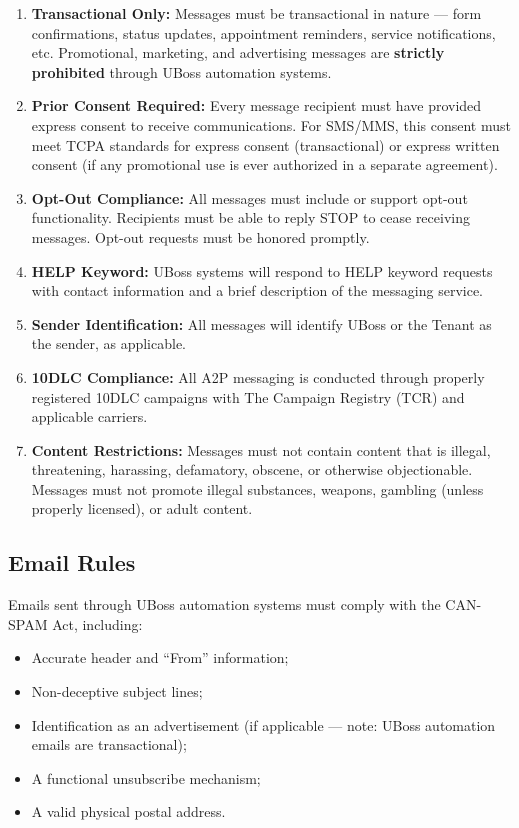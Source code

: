 \documentclass[11pt,letterpaper,parskip=half]{scrartcl}
\begin{document}
\begin{enumerate}[nosep, leftmargin=1.5em]
    \item \textbf{Transactional Only:} Messages must be transactional in nature --- form confirmations, status updates, appointment reminders, service notifications, etc. Promotional, marketing, and advertising messages are \textbf{strictly prohibited} through UBoss automation systems.
    \item \textbf{Prior Consent Required:} Every message recipient must have provided express consent to receive communications. For SMS/MMS, this consent must meet TCPA standards for express consent (transactional) or express written consent (if any promotional use is ever authorized in a separate agreement).
    \item \textbf{Opt-Out Compliance:} All messages must include or support opt-out functionality. Recipients must be able to reply STOP to cease receiving messages. Opt-out requests must be honored promptly.
    \item \textbf{HELP Keyword:} UBoss systems will respond to HELP keyword requests with contact information and a brief description of the messaging service.
    \item \textbf{Sender Identification:} All messages will identify UBoss or the Tenant as the sender, as applicable.
    \item \textbf{10DLC Compliance:} All A2P messaging is conducted through properly registered 10DLC campaigns with The Campaign Registry (TCR) and applicable carriers.
    \item \textbf{Content Restrictions:} Messages must not contain content that is illegal, threatening, harassing, defamatory, obscene, or otherwise objectionable. Messages must not promote illegal substances, weapons, gambling (unless properly licensed), or adult content.
\end{enumerate}

\subsection{Email Rules}

Emails sent through UBoss automation systems must comply with the CAN-SPAM Act, including:

\begin{itemize}[nosep, leftmargin=1.5em]
    \item Accurate header and ``From'' information;
    \item Non-deceptive subject lines;
    \item Identification as an advertisement (if applicable --- note: UBoss automation emails are transactional);
    \item A functional unsubscribe mechanism;
    \item A valid physical postal address.
\end{itemize}
\end{document}

